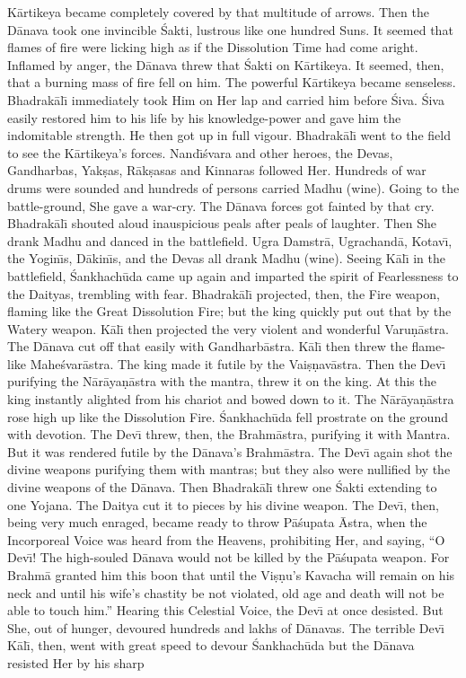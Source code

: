 K\=artikeya became completely covered by that multitude of arrows. Then the D\=anava took one invincible \'Sakti, lustrous like one hundred Suns. It seemed that flames of fire were licking high as if the Dissolution Time had come aright. Inflamed by anger, the D\=anava threw that \'Sakti on K\=artikeya. It seemed, then, that a burning mass of fire fell on him. The powerful K\=artikeya became senseless. Bhadrak\=al\={\i} immediately took Him on Her lap and carried him before \'Siva. \'Siva easily restored him to his life by his knowledge-power and gave him the indomitable strength. He then got up in full vigour. Bhadrak\=al\={\i} went to the field to see the K\=artikeya's forces. Nand\={\i}\'svara and other heroes, the Devas, Gandharbas, Yak\d{s}as, R\=ak\d{s}asas and Kinnaras followed Her. Hundreds of war drums were sounded and hundreds of persons carried Madhu (wine). Going to the battle-ground, She gave a war-cry. The D\=anava forces got fainted by that cry. Bhadrak\=al\={\i} shouted aloud inauspicious peals after peals of laughter. Then She drank Madhu and danced in the battlefield. Ugra Damstr\=a, Ugrachand\=a, Kotav\={\i}, the Yogin\={\i}s, D\=akin\={\i}s, and the Devas all drank Madhu (wine). Seeing K\=al\={\i} in the battlefield, \'Sankhach\=uda came up again and imparted the spirit of Fearlessness to the Daityas, trembling with fear. Bhadrak\=al\={\i} projected, then, the Fire weapon, flaming like the Great Dissolution Fire; but the king quickly put out that by the Watery weapon. K\=al\={\i} then projected the very violent and wonderful Varu\d{n}\=astra. The D\=anava cut off that easily with Gandharb\=astra. K\=al\={\i} then threw the flame-like Mahe\'svar\=astra. The king made it futile by the Vai\d{s}\d{n}av\=astra. Then the Dev\={\i} purifying the N\=ar\=aya\d{n}\=astra with the mantra, threw it on the king. At this the king instantly alighted from his chariot and bowed down to it. The N\=ar\=aya\d{n}\=astra rose high up like the Dissolution Fire. \'Sankhach\=uda fell prostrate on the ground with devotion. The Dev\={\i} threw, then, the Brahm\=astra, purifying it with Mantra. But it was rendered futile by the D\=anava's Brahm\=astra. The Dev\={\i} again shot the divine weapons purifying them with mantras; but they also were nullified by the divine weapons of the D\=anava. Then Bhadrak\=al\={\i} threw one \'Sakti extending to one Yojana. The Daitya cut it to pieces by his divine weapon. The Dev\={\i}, then, being very much enraged, became ready to throw P\=a\'supata \=Astra, when the Incorporeal Voice was heard from the Heavens, prohibiting Her, and saying, ``O Dev\={\i}! The high-souled D\=anava would not be killed by the P\=a\'supata weapon. For Brahm\=a granted him this boon that until the Vi\d{s}\d{n}u's Kavacha will remain on his neck and until his wife's chastity be not violated, old age and death will not be able to touch him.'' Hearing this Celestial Voice, the Dev\={\i} at once desisted. But She, out of hunger, devoured hundreds and lakhs of D\=anavas. The terrible Dev\={\i} K\=al\={\i}, then, went with great speed to devour \'Sankhach\=uda but the D\=anava resisted Her by his sharp

